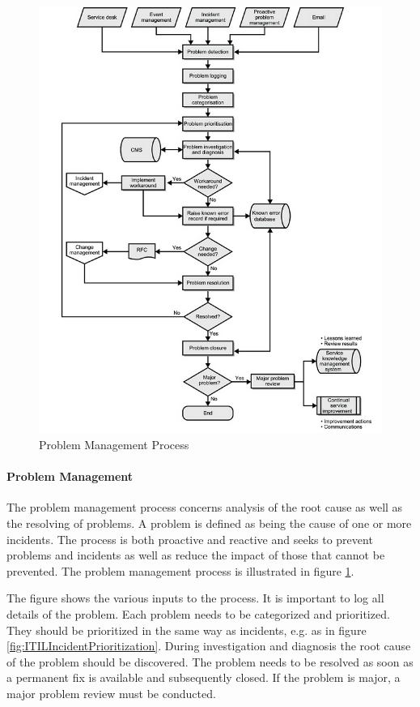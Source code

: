 \begin{figure}[H]
\hspace{-1cm}\includegraphics[scale=0.68]{ITILProblemManagement.png}
\caption[The ITIL Problem Management Process]{Problem Management Process \cite{itilbok}}
\label{fig:ITILProblemManagement}
\end{figure}

\paragraph{Problem Management}
The problem management process concerns analysis of the root cause as well as the resolving of problems. A problem is defined as being the cause of one or more incidents. The process is both proactive and reactive and seeks to prevent problems and incidents as well as reduce the impact of those that cannot be prevented. The problem management process is illustrated in figure \ref{fig:ITILProblemManagement}. 

The figure shows the various inputs to the process. It is important to log all details of the problem. Each problem needs to be categorized and prioritized. They should be prioritized in the same way as incidents, e.g. as in figure \ref{fig:ITILIncidentPrioritization}. During investigation and diagnosis the root cause of the problem should be discovered. The problem needs to be resolved as soon as a permanent fix is available and subsequently closed. If the problem is major, a major problem review must be conducted.

